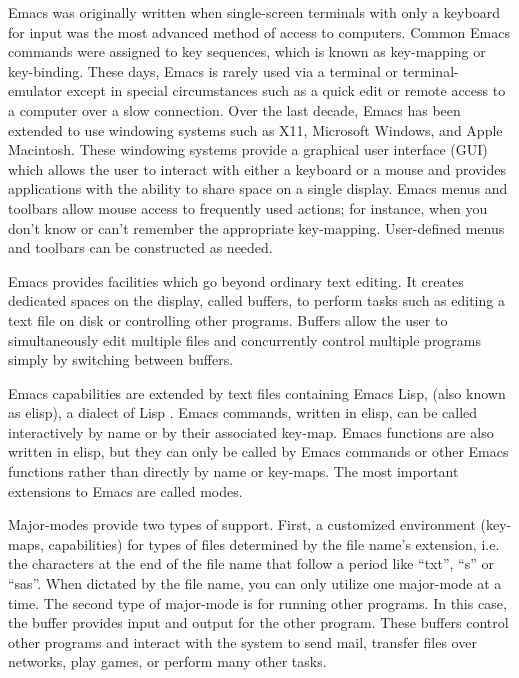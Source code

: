 \documentclass{article}
\begin{document}
Emacs was originally written when single-screen terminals with only a 
keyboard for input was the most advanced method of access to computers.  
Common Emacs commands were assigned to key sequences, which is known as 
key-mapping or key-binding.  These days, Emacs is rarely used via a 
terminal or terminal-emulator
except in special circumstances such as a quick edit or remote
access to a computer over a slow connection.  Over the last decade,
Emacs has been extended to use windowing systems such as X11,
Microsoft Windows, and Apple Macintosh.  These windowing systems
provide a graphical user interface (GUI) which allows the user to
interact with either a keyboard or a mouse and provides applications
with the ability to share space on a single display.  Emacs menus and
toolbars allow mouse access to frequently used actions; for instance,
when you don't know or can't remember the appropriate key-mapping.
User-defined menus and toolbars can be constructed as needed.

Emacs provides facilities which go beyond ordinary text editing.  It
creates dedicated spaces on the display, called buffers, to perform
tasks such as editing a text file on disk or controlling other
programs.  Buffers allow the user to simultaneously edit multiple files
and concurrently control multiple programs simply by switching between buffers.

Emacs capabilities are extended by text files containing Emacs Lisp,
(also known as elisp), a dialect of Lisp
\citep{RChassell1999,PGraham:1996}.  Emacs commands, written
in elisp, can be called interactively by name or by their associated key-map.  
Emacs functions are also written in elisp, but they can only be 
called by Emacs commands or other Emacs functions rather than directly
by name or key-maps.  The most important extensions to
Emacs are called modes.  

Major-modes provide two types of support.
First, a customized environment (key-maps, capabilities) for types
of files determined by the file name's extension, i.e. the characters
at the end of the file name that follow a period like ``txt'', ``s''
or ``sas''.  When dictated by the file name, you can only
utilize one major-mode at a time. 
The second type of major-mode is for running other programs.  In this
case, the buffer provides input and output for the other program.  These
buffers control other programs and interact with the system to send mail,
transfer files over networks, play games, or perform many other tasks.
\end{document}
